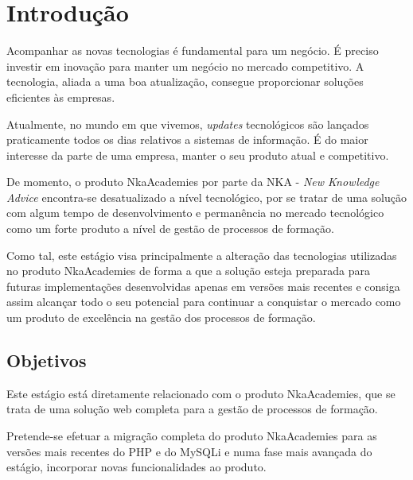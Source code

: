 
\chapter{Introdução}


Acompanhar as novas tecnologias é fundamental para um negócio. É preciso investir em inovação para manter um negócio no mercado competitivo. A tecnologia, aliada a uma boa atualização, consegue proporcionar soluções eficientes às empresas.

Atualmente, no mundo em que vivemos, \textit{updates} tecnológicos são lançados praticamente todos os dias relativos a sistemas de informação. É do maior interesse da parte de uma empresa, manter o seu produto atual e competitivo.

De momento, o produto NkaAcademies por parte da NKA - \textit{New Knowledge Advice} encontra-se desatualizado a nível tecnológico, por se tratar de uma solução com algum tempo de desenvolvimento e permanência no mercado tecnológico como um forte produto a nível de gestão de processos de formação.

Como tal, este estágio visa principalmente a alteração das tecnologias utilizadas no produto NkaAcademies de forma a que a solução esteja preparada para futuras implementações desenvolvidas apenas em versões mais recentes e consiga assim alcançar todo o seu potencial para continuar a conquistar o mercado como um produto de excelência na gestão dos processos de formação.



\section{Objetivos}


Este estágio está diretamente relacionado com o produto NkaAcademies, que se trata de uma solução web completa para a gestão de processos de formação.

Pretende-se efetuar a migração completa do produto NkaAcademies para as versões mais recentes do PHP e do MySQLi e numa fase mais avançada do estágio, incorporar novas funcionalidades ao produto.

